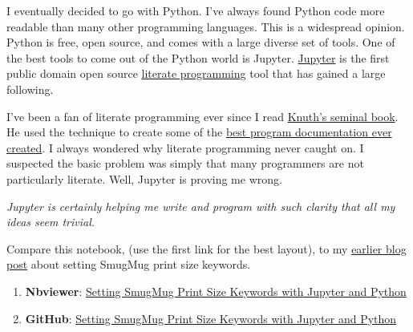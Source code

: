 I eventually decided to go with Python. I've always found Python code
more readable than many other programming languages. This is a
widespread opinion. Python is free, open source, and comes with a large
diverse set of tools. One of the best tools to come out of the Python
world is Jupyter. \href{https://jupyter.org/}{Jupyter} is the first
public domain open source
\href{https://en.wikipedia.org/wiki/Literate_programming}{literate
programming} tool that has gained a large following.

I've been a fan of literate programming ever since I read
\href{https://en.wikipedia.org/wiki/Literate_programming}{Knuth's
seminal book}. He used the technique to create some of the
\href{https://www.amazon.com/TeXbook-Donald-Knuth/dp/0201134489}{best
program documentation ever created}. I always wondered why literate
programming never caught on. I suspected the basic problem was simply
that many programmers are not particularly literate. Well, Jupyter is
proving me wrong.

\emph{Jupyter is certainly helping me write and program with such
clarity that all my ideas seem trivial.}

Compare this notebook, (use the first link for the best layout), to my
\href{https://analyzethedatanotthedrivel.org/2010/02/21/assigning-smugmug-print-size-keys/}{earlier
blog post} about setting SmugMug print size keywords.

\begin{enumerate}
\def\labelenumi{\arabic{enumi}.}
\item
  \textbf{Nbviewer}:
  \href{https://nbviewer.jupyter.org/github/bakerjd99/smugpyter/blob/master/notebooks/Setting%20SmugMug%20Print%20Size%20and%20Geotag%20Keywords%20with%20Jupyter%20and%20Python.ipynb}{Setting
  SmugMug Print Size Keywords with Jupyter and Python}
\item
  \textbf{GitHub}:
  \href{https://github.com/bakerjd99/smugpyter/blob/master/notebooks/Setting%20SmugMug%20Print%20Size%20and%20Geotag%20Keywords%20with%20Jupyter%20and%20Python.ipynb}{Setting
  SmugMug Print Size Keywords with Jupyter and Python}
\end{enumerate}

